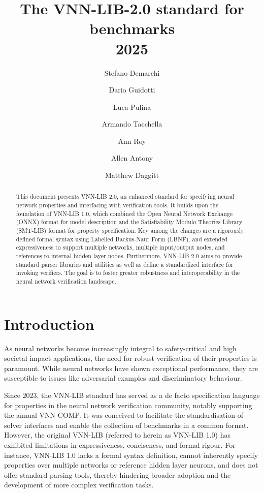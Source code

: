 \documentclass[12pt,a4paper]{report}
\title{The VNN-LIB-2.0 standard for benchmarks\\2025}
\author[1]{Stefano Demarchi}
\author[2]{Dario Guidotti}
\author[2]{Luca Pulina}
\author[1]{Armando Tacchella}
\author[3]{Ann Roy}
\author[3]{Allen Antony}
\author[3]{Matthew Daggitt}
\affil[1]{University of Genoa, Viale Causa 13, 16145 Genoa, Italy}
\affil[2]{University of Sassari, Via Roma 151, 07100 Sassari, Italy}
\affil[3]{University of Western Australia, 35 Stirling Hwy, Crawley WA 6009, Australia}
\begin{document}
\maketitle

\begin{abstract}
This document presents VNN-LIB 2.0, an enhanced standard for specifying neural network properties and 
interfacing with verification tools. It builds upon the foundation of VNN-LIB 1.0, which combined the 
Open Neural Network Exchange (ONNX) format for model description and the Satisfiability Modulo Theories Library (SMT-LIB) 
format for property specification. Key among the changes are a rigorously defined formal syntax using Labelled Backus-Naur Form (LBNF), 
and extended expressiveness to support multiple networks, multiple input/output nodes, and references to internal hidden layer nodes. 
Furthermore, VNN-LIB 2.0 aims to provide standard parser libraries and utilities as well as define a standardized interface for invoking verifiers. 
The goal is to foster greater robustness and interoperability in the neural network verification landscape.
\end{abstract}


\section*{Introduction}

As neural networks become increasingly integral to safety-critical and high societal impact applications\cite{1, 2, 3}, 
the need for robust verification of their properties is paramount. While neural networks have shown exceptional performance, 
they are susceptible to issues like adversarial examples\cite{3} and discriminatory behaviour\cite{4}.

Since 2023, the VNN-LIB standard\cite{5} has served as a de facto specification language for properties in the neural network verification 
community, notably supporting the annual VNN-COMP\cite{7}. It was conceived to facilitate the standardisation of solver interfaces and 
enable the collection of benchmarks in a common format. However, the original VNN-LIB (referred to herein as VNN-LIB 1.0) has exhibited 
limitations in expressiveness, conciseness, and formal rigour\cite{5, 7}. For instance, VNN-LIB 1.0 lacks a formal syntax definition, 
cannot inherently specify properties over multiple networks or reference hidden layer neurons, and does not offer standard parsing tools, 
thereby hindering broader adoption and the development of more complex verification tasks. 
\end{document}
